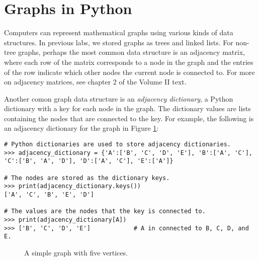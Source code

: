 \label{lab:SixDegreesKevinBacon}


\section*{Graphs in Python} %

Computers can represent mathematical graphs using various kinds of data structures.
In previous labs, we stored graphs as trees and linked lists.
For non-tree graphs, perhaps the most common data structure is an adjacency matrix, where each row of the matrix corresponds to a node in the graph and the entries of the row indicate which other nodes the current node is connected to.
For more on adjacency matrices, see chapter 2 of the Volume II text.

Another comon graph data structure is an \emph{adjacency dictionary}, a Python dictionary with a key for each node in the graph.
The dictionary values are lists containing the nodes that are connected to the key.
For example, the following is an adjacency dictionary for the graph in Figure \ref{fig:simple_graph}:

\begin{lstlisting}
# Python dictionaries are used to store adjacency dictionaries.
>>> adjacency_dictionary = {'A':['B', 'C', 'D', 'E'], 'B':['A', 'C'],
'C':['B', 'A', 'D'], 'D':['A', 'C'], 'E':['A']}

# The nodes are stored as the dictionary keys.
>>> print(adjacency_dictionary.keys())
['A', 'C', 'B', 'E', 'D']

# The values are the nodes that the key is connected to.
>>> print(adjacency_dictionary[A])
>>> ['B', 'C', 'D', 'E']            # A in connected to B, C, D, and E.
\end{lstlisting}

\begin{figure}
\centering
{}
\caption{A simple graph with five vertices.}
\label{fig:simple_graph}
\end{figure}

